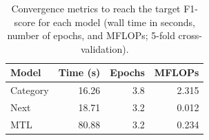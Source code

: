\begin{table}[htbp]
\caption{Convergence metrics to reach the target F1-score for each model (wall time in seconds, number of epochs, and MFLOPs; 5-fold cross-validation).}
\label{tab:cbic:convergence}
\centering
\begin{tabular}{lrrr}
\toprule
\textbf{Model}    & \textbf{Time (s)} & \textbf{Epochs} & \textbf{MFLOPs} \\
\midrule
Category & 16.26 & 3.8 & 2.315 \\
Next     & 18.71 & 3.2 & 0.012 \\
MTL      & 80.88 & 3.2 & 0.234 \\
\bottomrule
\end{tabular}
\end{table}
